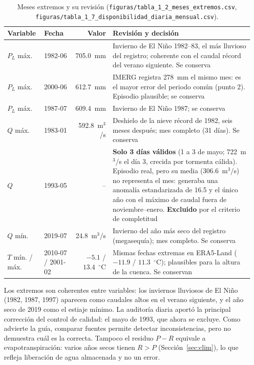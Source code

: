 \documentclass[11pt,a4paper]{article}
\newcommand{\archivo}[1]{\nolinkurl{#1}}
\newcommand{\PL}{P_L}
\newcommand{\Qm}{Q}
\begin{document}
\begin{table}[H]
\centering\footnotesize
\caption{Meses extremos y su revisión (\archivo{figuras/tabla_1_2_meses_extremos.csv}, \archivo{figuras/tabla_1_7_disponibilidad_diaria_mensual.csv}).}
\label{tab:extremos}
\begin{tabularx}{\textwidth}{llr>{\raggedright\arraybackslash}X}
\toprule
Variable & Fecha & Valor & Revisión y decisión \\
\midrule
$\PL$ máx. & 1982-06 & 705.0~mm & Invierno de El Niño 1982--83, el más lluvioso del registro; coherente con el caudal récord del verano siguiente. Se conserva \\
$\PL$ máx. & 2000-06 & 612.7~mm & IMERG registra 278~mm el mismo mes: es el mayor error del periodo común (punto 2). Episodio plausible; se conserva \\
$\PL$ máx. & 1987-07 & 609.4~mm & Invierno de El Niño 1987; se conserva \\
$\Qm$ máx. & 1983-01 & 592.8~m$^3$/s & Deshielo de la nieve récord de 1982, seis meses después; mes completo (31 días). Se conserva \\
$\Qm$ & 1993-05 & -- & \textbf{Solo 3 días válidos} (1 a 3 de mayo; 722~m$^3$/s el día 3, crecida por tormenta cálida). Episodio real, pero su media (306.6~m$^3$/s) no representa el mes: generaba una anomalía estandarizada de 16.5 y el único año con el máximo de caudal fuera de noviembre--enero. \textbf{Excluido} por el criterio de completitud \\
$\Qm$ mín. & 2019-07 & 24.8~m$^3$/s & Invierno del año más seco del registro (megasequía); mes completo. Se conserva \\
$T$ mín. / máx. & 2010-07 / 2001-02 & $-5.1$ / $13.4$~$^\circ$C & Mismas fechas extremas en ERA5-Land ($-11.9$ / $11.3$~$^\circ$C); plausibles para la altura de la cuenca. Se conservan \\
\bottomrule
\end{tabularx}
\end{table}

Los extremos son coherentes entre variables: los inviernos lluviosos de El Niño (1982, 1987, 1997) aparecen como caudales altos en el verano siguiente, y el año seco de 2019 como el estiaje mínimo. La auditoría diaria aportó la principal corrección del control de calidad: el mayo de 1993, que ahora se excluye. Como advierte la guía, comparar fuentes permite detectar inconsistencias, pero no demuestra cuál es la correcta. Tampoco el residuo $P-R$ equivale a evapotranspiración: varios años secos tienen $R>P$ (Sección~\ref{sec:clim}), lo que refleja liberación de agua almacenada y no un error.
\end{document}
